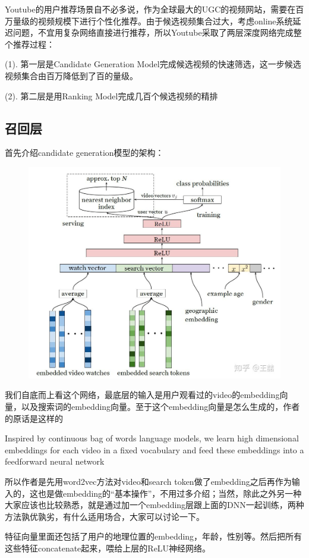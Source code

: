 \documentclass[12pt]{article}
\begin{document}
Youtube的用户推荐场景自不必多说，作为全球最大的UGC的视频网站，需要在百万量级的视频规模下进行个性化推荐。由于候选视频集合过大，考虑online系统延迟问题，不宜用复杂网络直接进行推荐，所以Youtube采取了两层深度网络完成整个推荐过程：

(1). 第一层是Candidate Generation Model完成候选视频的快速筛选，这一步候选视频集合由百万降低到了百的量级。

(2). 第二层是用Ranking Model完成几百个候选视频的精排

\subsection{召回层}
首先介绍candidate generation模型的架构：
\begin{figure}[H]
    \centering
    \includegraphics[width=.8\textwidth]{fig/Youtube_Candidate_Generation_Model.jpg}
\end{figure}

我们自底而上看这个网络，最底层的输入是用户观看过的video的embedding向量，以及搜索词的embedding向量。至于这个embedding向量是怎么生成的，作者的原话是这样的

Inspired by continuous bag of words language models, we learn high dimensional embeddings for each video in a fixed vocabulary and feed these embeddings into a feedforward neural network

所以作者是先用word2vec方法对video和search token做了embedding之后再作为输入的，这也是做embedding的“基本操作”，不用过多介绍；当然，除此之外另一种大家应该也比较熟悉，就是通过加一个embedding层跟上面的DNN一起训练，两种方法孰优孰劣，有什么适用场合，大家可以讨论一下。

特征向量里面还包括了用户的地理位置的embedding，年龄，性别等。然后把所有这些特征concatenate起来，喂给上层的ReLU神经网络。
\end{document}
